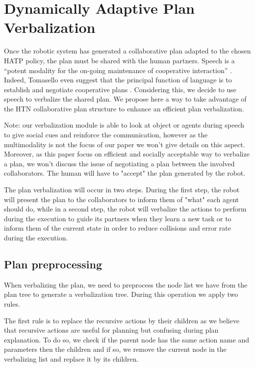 \documentclass{llncs}
\begin{document}

\section{Dynamically Adaptive Plan Verbalization}
\label{planVerbalization}

Once the robotic system has generated a collaborative plan adapted to the chosen HATP policy, the plan must be shared with the human partners.
Speech is a ``potent modality for the on-going maintenance of cooperative interaction'' \cite{Lallee2013}. Indeed, Tomasello even suggest that the principal function of language is to establish and negotiate cooperative plans \cite{tomasello2005}.
Considering this, we decide to use speech to verbalize the shared plan. We propose here a way to take advantage of the HTN collaborative plan structure to enhance an efficient plan verbalization.

Note: our verbalization module is able to look at object or agents during speech to give social cues and reinforce the communication, however as the multimodality is not the focus of our paper we won't give details on this aspect. Moreover, as this paper focus on efficient and socially acceptable way to verbalize a plan, we won't discuss the issue of negotiating a plan between the involved collaborators. The human will have to "accept" the plan generated by the robot.

The plan verbalization will occur in two steps.
During the first step, the robot will present the plan to the collaborators to inform them of "what" each agent should do, while in a second step, the robot will verbalize the actions to perform during the execution to guide its partners when they learn a new task or to inform them of the current state in order to reduce collisions and error rate during the execution.


\subsection{Plan preprocessing}
\label{preprocess}
When verbalizing the plan, we need to preprocess the node list we have from the plan tree to generate a verbalization tree.
During this operation we apply two rules.

The first rule is to replace the recursive actions by their children as we believe that recursive actions are useful for planning but confusing during plan explanation. To do so, we check if the parent node has the same action name and parameters then the children and if so, we remove the current node in the verbalizing list and replace it by its children.
\end{document}
